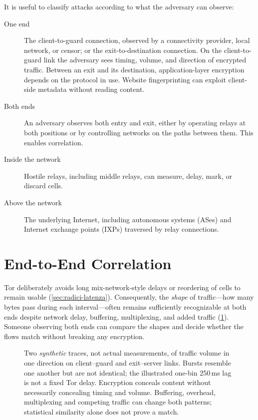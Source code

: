 It is useful to classify attacks according to what the adversary can observe:
\begin{description}
  \item[One end] The client-to-guard connection, observed by a connectivity provider, local network, or censor; or the exit-to-destination connection. On the client-to-guard link the adversary sees timing, volume, and direction of encrypted traffic. Between an exit and its destination, application-layer encryption depends on the protocol in use. Website fingerprinting can exploit client-side metadata without reading content.
  \item[Both ends] An adversary observes both entry and exit, either by operating relays at both positions or by controlling networks on the paths between them. This enables correlation.
  \item[Inside the network] Hostile relays, including middle relays, can measure, delay, mark, or discard cells.
  \item[Above the network] The underlying Internet, including autonomous systems (ASes) and Internet exchange points (IXPs) traversed by relay connections.
\end{description}

\section{End-to-End Correlation}\label{sec:att-correlazione}

Tor deliberately avoids long mix-network-style delays or reordering of cells to remain usable (\cref{sec:radici-latenza}). Consequently, the \emph{shape} of traffic---how many bytes pass during each interval---often remains sufficiently recognizable at both ends despite network delay, buffering, multiplexing, and added traffic (\cref{fig:correlazione}). Someone observing both ends can compare the shapes and decide whether the flows match without breaking any encryption.

\begin{figure}[htbp]
\centering

\caption{Two \emph{synthetic} traces, not actual measurements, of traffic volume in one direction on client--guard and exit--server links. Bursts resemble one another but are not identical; the illustrated one-bin 250\,ms lag is not a fixed Tor delay. Encryption conceals content without necessarily concealing timing and volume. Buffering, overhead, multiplexing and competing traffic can change both patterns; statistical similarity alone does not prove a match.}
\label{fig:correlazione}
\end{figure}

